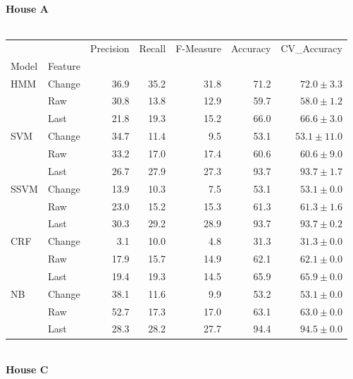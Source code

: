 \documentclass{article}
\begin{document}
\textbf{House A}\\
\vspace{1cm}\\
\begin{tabular}{llrrrrr}
\toprule
    &        &  Precision &  Recall &  F-Measure &  Accuracy &    CV\_Accuracy \\
Model & Feature &            &         &            &           &                \\
\midrule
HMM & Change &       36.9 &    35.2 &       31.8 &      71.2 &   $72.0\pm3.3$ \\
    & Raw &       30.8 &    13.8 &       12.9 &      59.7 &   $58.0\pm1.2$ \\
    & Last &       21.8 &    19.3 &       15.2 &      66.0 &   $66.6\pm3.0$ \\
SVM & Change &       34.7 &    11.4 &        9.5 &      53.1 &  $53.1\pm11.0$ \\
    & Raw &       33.2 &    17.0 &       17.4 &      60.6 &   $60.6\pm9.0$ \\
    & Last &       26.7 &    27.9 &       27.3 &      93.7 &   $93.7\pm1.7$ \\
SSVM & Change &       13.9 &    10.3 &        7.5 &      53.1 &   $53.1\pm0.0$ \\
    & Raw &       23.0 &    15.2 &       15.3 &      61.3 &   $61.3\pm1.6$ \\
    & Last &       30.3 &    29.2 &       28.9 &      93.7 &   $93.7\pm0.2$ \\
CRF & Change &        3.1 &    10.0 &        4.8 &      31.3 &   $31.3\pm0.0$ \\
    & Raw &       17.9 &    15.7 &       14.9 &      62.1 &   $62.1\pm0.0$ \\
    & Last &       19.4 &    19.3 &       14.5 &      65.9 &   $65.9\pm0.0$ \\
NB & Change &       38.1 &    11.6 &        9.9 &      53.2 &   $53.1\pm0.0$ \\
    & Raw &       52.7 &    17.3 &       17.0 &      63.1 &   $63.0\pm0.0$ \\
    & Last &       28.3 &    28.2 &       27.7 &      94.4 &   $94.5\pm0.0$ \\
\bottomrule
\end{tabular}
\vspace{1cm}\\
\textbf{House C}\\
\vspace{1cm}\\
\end{document}
